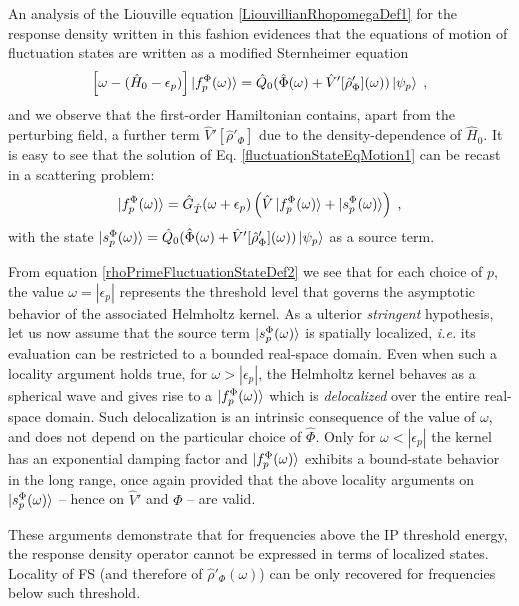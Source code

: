 \documentclass[reprint,aps,prb]{revtex4-1}
\newcommand{\eps}{\epsilon}
\newcommand{\be}{\begin{equation}}
\newcommand{\ee}{\end{equation}}
\newcommand{\lb}{\label}
\newcommand{\op}[1]{\hat {#1}}
\newcommand{\dm}{\op{\rho}}
\newcommand{\hnot}{\op{H}_0}
\newcommand{\GH}{\op G_{\op T}}
\begin{document}
An analysis of the Liouville equation \eqref{LiouvillianRhopomegaDef1} for the response density written in this fashion evidences that the equations of motion of fluctuation states  are
written as a modified Sternheimer equation~\cite{mahan1980,giustino2012,giustino2014}
\be\lb{fluctuationStateEqMotion1}
\left[\omega - (\hnot-\eps_p)\right]\ket{f_p^\Phi(\omega)} = \op Q_0(\op\Phi(\omega)+\op V'[\dm'_\Phi](\omega))\ket{\psi_p} \;,
\ee
and we observe that the first-order Hamiltonian contains,
apart from the perturbing field, a further term $\op V'[\dm'_\Phi]$ due to the density-dependence of $\hnot$.
It is easy to see that the solution of Eq. \eqref{fluctuationStateEqMotion1} can be recast in a scattering problem:
\be\lb{rhoPrimeFluctuationStateDef2}
\ket{f_p^\Phi(\omega)} = \GH(\omega+\epsilon_p)\left(\op V\ket{f_p^\Phi(\omega)} + \ket{s_p^\Phi(\omega)} \right)\;,
\ee
with the state
$
\ket{s_p^\Phi(\omega)} = \op Q_0(\op \Phi(\omega) +\op V'[\dm'_\Phi](\omega) )\ket{\psi_p}
$ as a source term.

From equation \eqref{rhoPrimeFluctuationStateDef2} we see that for each choice of $p$, the value $\omega = |\eps_p|$ represents the threshold level that governs the asymptotic behavior of the associated Helmholtz kernel.
As a ulterior \emph{stringent} hypothesis, let us now assume that the source term $\ket{s_p^\Phi(\omega)}$ is spatially localized, \textit{i.e.} its evaluation can be restricted to a bounded real-space domain.
Even when such a locality argument holds true, for $\omega > |\eps_p|$,
the Helmholtz kernel behaves as a spherical wave and  gives rise to a $\ket{f^\Phi_p(\omega)}$ which is \emph{delocalized} over the entire real-space domain.
Such delocalization is an intrinsic consequence of the value of $\omega$, and does not depend on the particular choice of
$\op \Phi$.
Only for $\omega < |\eps_p|$ the kernel has an exponential damping factor and $\ket{f^\Phi_p(\omega)}$ exhibits a bound-state behavior in the long range,
once again provided that the above locality arguments on $\ket{s_p^\Phi(\omega)}$ -- hence on $\op V'$ and $\Phi$ -- are valid.

These arguments demonstrate that for frequencies above the IP threshold energy, the response density operator cannot be expressed in terms of localized states. Locality of FS (and therefore of $\dm'_\Phi(\omega)$) can be only recovered for frequencies below such threshold.
\end{document}

